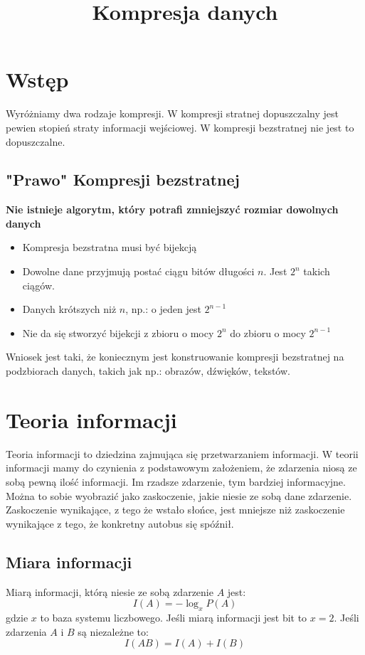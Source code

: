 \documentclass{../notatki}
\title{Kompresja danych}
\begin{document}
\tableofcontents

\section{Wstęp}

Wyróżniamy dwa rodzaje kompresji. W kompresji stratnej dopuszczalny jest pewien
stopień straty informacji wejściowej. W kompresji bezstratnej nie jest to
dopuszczalne.

\subsection{"Prawo" Kompresji bezstratnej}

\textbf{Nie istnieje algorytm, który potrafi zmniejszyć rozmiar
dowolnych danych}

\begin{itemize}
  \item Kompresja bezstratna musi być bijekcją
  \item Dowolne dane przyjmują postać ciągu bitów długości $n$. Jest
    $2^n$ takich ciągów.
  \item Danych krótszych niż $n$, np.: o jeden jest $2^{n - 1}$
  \item Nie da się stworzyć bijekcji z zbioru o mocy $2^n$ do zbioru o
    mocy $2^{n - 1}$
\end{itemize}
Wniosek jest taki, że koniecznym jest konstruowanie kompresji bezstratnej na
podzbiorach danych, takich jak np.: obrazów, dźwięków, tekstów.

\section{Teoria informacji}

Teoria informacji to dziedzina zajmująca się przetwarzaniem informacji.
W teorii informacji mamy do czynienia z podstawowym założeniem, że zdarzenia
niosą ze sobą pewną ilość informacji. Im rzadsze zdarzenie, tym bardziej
informacyjne. Można to sobie wyobrazić jako zaskoczenie, jakie niesie ze sobą
dane zdarzenie. Zaskoczenie wynikające, z tego że wstało słońce, jest mniejsze
niż zaskoczenie wynikające z tego, że konkretny autobus się spóźnił.

\subsection{Miara informacji}

Miarą informacji, którą niesie ze sobą zdarzenie $A$ jest:
$$
I(A) = -\log_xP(A)
$$
gdzie $x$ to baza systemu liczbowego. Jeśli miarą informacji jest bit to $x=2$.
Jeśli zdarzenia $A$ i $B$ są niezależne to:
$$
I(AB) = I(A) + I(B)
$$
\end{document}
